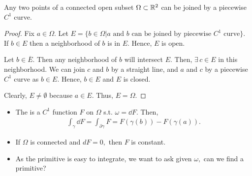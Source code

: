 \documentclass[a4paper,12pt]{article}
\begin{document}
\begin{lemma}
    Any two points of a connected open subset $\Omega\subset\mathbb{R}^2$ can be joined by a piecewise $C^1$ curve.
    \begin{proof}
        Fix $a\in\Omega.$ Let $E=\{b\in\Omega|\text{$a$ and $b$ can be joined by piecewise $C^1$ curve}\}.$ If $b\in E$ then a neighborhood of $b$ is in $E.$ Hence, $E$ is open.

        Let $b\in\overline E.$ Then any neighborhood of $b$ will intersect $E.$ Then, $\exists\,c\in E$ in this neighborhood. We can join $c$ and $b$ by a straight line, and $a$ and $c$ by a piecewise $C^1$ curve as $b\in E$. Hence, $b\in E$ and $E$ is closed.

        Clearly, $E\neq\emptyset$ because $a\in E.$ Thus, $E=\Omega.$
    \end{proof}
\end{lemma}
\begin{itemize}
    \item The  is a $C^1$ function $F$ on $\Omega$ s.t. $\omega=\dd F.$ Then, \begin{align}
        \int_\gamma\dd F=\int_{\partial\gamma} F=F(\gamma(b))-F(\gamma(a)).
    \end{align}
    \item If $\Omega$ is connected and $dF=0,$ then $F$ is constant.
    \item As the primitive is easy to integrate, we want to ask given $\omega,$ can we find a primitive?
\end{itemize}
\end{document}
